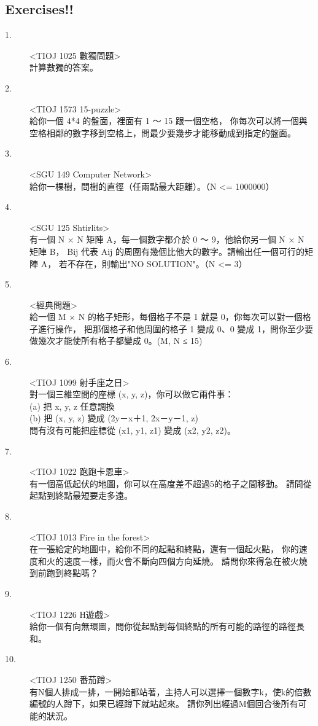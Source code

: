 \documentclass{article}
\begin{document}
\subsection{Exercises!!}
\begin{description}
\item[ 1.]<TIOJ 1025 數獨問題>\\
計算數獨的答案。
\item[ 2.]<TIOJ 1573 15-puzzle>\\
給你一個 4*4 的盤面，裡面有 1 ～ 15 跟一個空格，
你每次可以將一個與空格相鄰的數字移到空格上，問最少要幾步才能移動成到指定的盤面。
\item[ 3.]<SGU 149 Computer Network>\\
給你一棵樹，問樹的直徑（任兩點最大距離）。（N <= 1000000）
\item[ 4.]<SGU 125 Shtirlits>\\
有一個 N × N 矩陣 A，每一個數字都介於 0 ～ 9，他給你另一個 N × N 矩陣 B，
Bij 代表 Aij 的周圍有幾個比他大的數字。請輸出任一個可行的矩陣 A，
若不存在，則輸出"NO SOLUTION"。（N <= 3）
\item[ 5.]<經典問題>\\
給一個 M × N 的格子矩形，每個格子不是 1 就是 0，你每次可以對一個格子進行操作，
把那個格子和他周圍的格子 1 變成 0、0 變成 1，問你至少要做幾次才能使所有格子都變成 0。(M, N ≤ 15)
\item[ 6.]<TIOJ 1099 射手座之日>\\
對一個三維空間的座標 (x, y, z)，你可以做它兩件事：\\
(a) 把 x, y, z 任意調換\\
(b) 把 (x, y, z) 變成 (2y－x＋1, 2x－y－1, z)\\
問有沒有可能把座標從 (x1, y1, z1) 變成 (x2, y2, z2)。
\item[ 7.]<TIOJ 1022 跑跑卡恩車>\\
有一個高低起伏的地圖，你可以在高度差不超過5的格子之間移動。
請問從起點到終點最短要走多遠。
\item[ 8.]<TIOJ 1013 Fire in the forest>\\
在一張給定的地圖中，給你不同的起點和終點，還有一個起火點，
你的速度和火的速度一樣，而火會不斷向四個方向延燒。
請問你來得急在被火燒到前跑到終點嗎？
\item[ 9.]<TIOJ 1226 H遊戲>\\
給你一個有向無環圖，問你從起點到每個終點的所有可能的路徑的路徑長和。
\item[ 10.]<TIOJ 1250 番茄蹲>\\
有N個人排成一排，一開始都站著，主持人可以選擇一個數字k，使k的倍數編號的人蹲下，如果已經蹲下就站起來。
請你列出經過M個回合後所有可能的狀況。
\end{description}
\end{document}
